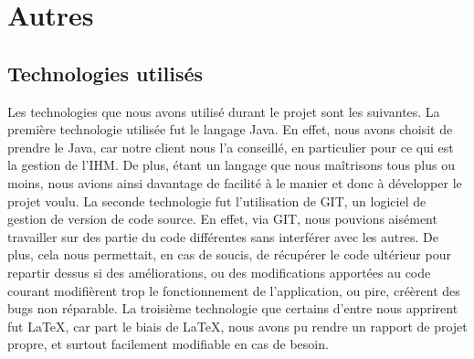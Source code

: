 \section{Autres}

\subsection{Technologies utilisés}
	Les technologies que nous avons utilisé durant le projet sont les suivantes.\newline
	La première technologie utilisée fut le langage Java. En effet, nous avons choisit de prendre le Java, car notre client nous l'a conseillé, en particulier pour ce qui est la gestion de l'IHM. De plus, étant un langage que nous maîtrisons tous plus ou moins, nous avions ainsi davantage de facilité à le manier et donc à développer le projet voulu.\newline
	La seconde technologie fut l'utilisation de GIT, un logiciel de gestion de version de code source. En effet, via GIT, nous pouvions aisément travailler sur des partie du code différentes sans interférer avec les autres. De plus, cela nous permettait, en cas de soucis, de récupérer le code ultérieur pour repartir dessus si des améliorations, ou des modifications apportées au code courant modifièrent trop le fonctionnement de l'application, ou pire, créèrent des bugs non réparable.\newline
	La troisième technologie que certains d'entre nous apprirent fut \LaTeX{}, car part le biais de \LaTeX{}, nous avons pu rendre un rapport de projet propre, et surtout facilement modifiable en cas de besoin.

